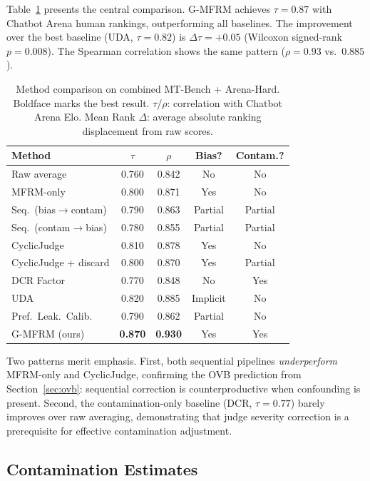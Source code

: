 \documentclass[11pt]{article}
\newcommand{\gmfrm}{\textsc{G-MFRM}}
\begin{document}
Table~\ref{tab:main-results} presents the central comparison. \gmfrm{} achieves $\tau = 0.87$ with Chatbot Arena human rankings, outperforming all baselines. The improvement over the best baseline (UDA, $\tau = 0.82$) is $\Delta\tau = +0.05$ (Wilcoxon signed-rank $p = 0.008$). The Spearman correlation shows the same pattern ($\rho = 0.93$ vs.\ $0.885$).

\begin{table}[t]
\centering
\caption{Method comparison on combined MT-Bench + Arena-Hard. Boldface marks the best result. $\tau$/$\rho$: correlation with Chatbot Arena Elo. Mean Rank $\Delta$: average absolute ranking displacement from raw scores.}
\label{tab:main-results}
\small
\begin{tabular}{@{}lcccc@{}}
\toprule
Method & $\tau$ & $\rho$ & Bias? & Contam.? \\
\midrule
Raw average & 0.760 & 0.842 & No & No \\
MFRM-only & 0.800 & 0.871 & Yes & No \\
Seq.\ (bias$\to$contam) & 0.790 & 0.863 & Partial & Partial \\
Seq.\ (contam$\to$bias) & 0.780 & 0.855 & Partial & Partial \\
CyclicJudge & 0.810 & 0.878 & Yes & No \\
CyclicJudge + discard & 0.800 & 0.870 & Yes & Partial \\
DCR Factor & 0.770 & 0.848 & No & Yes \\
UDA & 0.820 & 0.885 & Implicit & No \\
Pref.\ Leak.\ Calib. & 0.790 & 0.862 & Partial & No \\
\midrule
\gmfrm{} (ours) & \textbf{0.870} & \textbf{0.930} & Yes & Yes \\
\bottomrule
\end{tabular}
\end{table}

Two patterns merit emphasis. First, both sequential pipelines \emph{underperform} MFRM-only and CyclicJudge, confirming the OVB prediction from Section~\ref{sec:ovb}: sequential correction is counterproductive when confounding is present. Second, the contamination-only baseline (DCR, $\tau = 0.77$) barely improves over raw averaging, demonstrating that judge severity correction is a prerequisite for effective contamination adjustment.

\subsection{Contamination Estimates}
\label{sec:contamination}
\end{document}
